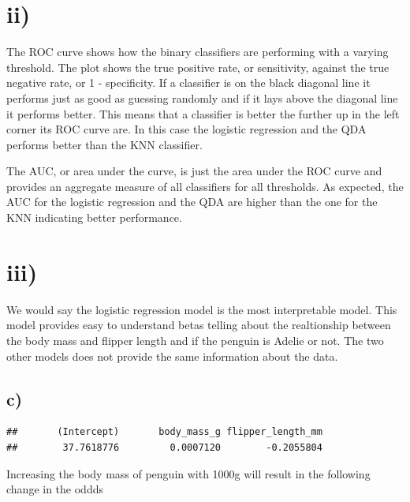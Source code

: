 \documentclass[
]{article}
\newenvironment{Shaded}{\begin{snugshade}}{\end{snugshade}}
\newcommand{\NormalTok}[1]{#1}
\newcommand{\SpecialCharTok}[1]{\textcolor[rgb]{0.00,0.00,0.00}{#1}}
\begin{document}
\hypertarget{ii-1}{%
\section{ii)}\label{ii-1}}

The ROC curve shows how the binary classifiers are performing with a
varying threshold. The plot shows the true positive rate, or
sensitivity, against the true negative rate, or 1 - specificity. If a
classifier is on the black diagonal line it performs just as good as
guessing randomly and if it lays above the diagonal line it performs
better. This means that a classifier is better the further up in the
left corner its ROC curve are. In this case the logistic regression and
the QDA performs better than the KNN classifier.

The AUC, or area under the curve, is just the area under the ROC curve
and provides an aggregate measure of all classifiers for all thresholds.
As expected, the AUC for the logistic regression and the QDA are higher
than the one for the KNN indicating better performance.

\hypertarget{iii-1}{%
\section{iii)}\label{iii-1}}

We would say the logistic regression model is the most interpretable
model. This model provides easy to understand betas telling about the
realtionship between the body mass and flipper length and if the penguin
is Adelie or not. The two other models does not provide the same
information about the data.

\hypertarget{c-2}{%
\subsection{c)}\label{c-2}}

\begin{Shaded}
\end{Shaded}

\begin{verbatim}
##       (Intercept)       body_mass_g flipper_length_mm 
##        37.7618776         0.0007120        -0.2055804
\end{verbatim}

Increasing the body mass of penguin with 1000g will result in the
following change in the oddds
\end{document}
